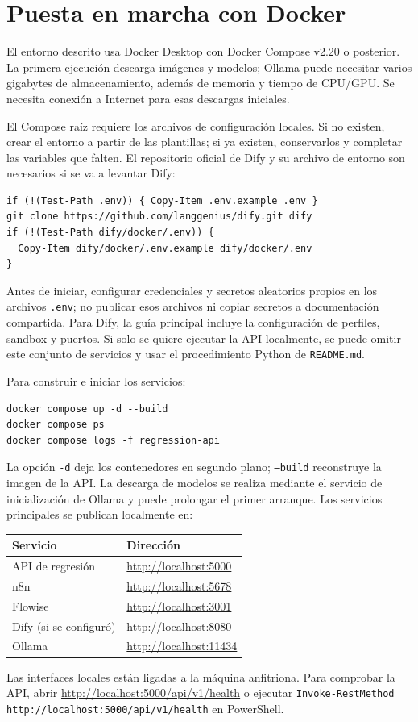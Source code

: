 \documentclass[11pt,a4paper]{article}
\begin{document}
\section{Puesta en marcha con Docker}
El entorno descrito usa Docker Desktop con Docker Compose v2.20 o posterior. La primera ejecución descarga imágenes y modelos; Ollama puede necesitar varios gigabytes de almacenamiento, además de memoria y tiempo de CPU/GPU. Se necesita conexión a Internet para esas descargas iniciales.

El Compose raíz requiere los archivos de configuración locales. Si no existen, crear el entorno a partir de las plantillas; si ya existen, conservarlos y completar las variables que falten. El repositorio oficial de Dify y su archivo de entorno son necesarios si se va a levantar Dify:
\begin{lstlisting}
if (!(Test-Path .env)) { Copy-Item .env.example .env }
git clone https://github.com/langgenius/dify.git dify
if (!(Test-Path dify/docker/.env)) {
  Copy-Item dify/docker/.env.example dify/docker/.env
}
\end{lstlisting}
Antes de iniciar, configurar credenciales y secretos aleatorios propios en los archivos \texttt{.env}; no publicar esos archivos ni copiar secretos a documentación compartida. Para Dify, la guía principal incluye la configuración de perfiles, sandbox y puertos. Si solo se quiere ejecutar la API localmente, se puede omitir este conjunto de servicios y usar el procedimiento Python de \texttt{README.md}.

Para construir e iniciar los servicios:
\begin{lstlisting}
docker compose up -d --build
docker compose ps
docker compose logs -f regression-api
\end{lstlisting}
La opción \texttt{-d} deja los contenedores en segundo plano; \texttt{--build} reconstruye la imagen de la API. La descarga de modelos se realiza mediante el servicio de inicialización de Ollama y puede prolongar el primer arranque. Los servicios principales se publican localmente en:
\begin{center}
\begin{tabular}{ll}\toprule
Servicio & Dirección\\\midrule
API de regresión & \url{http://localhost:5000}\\
n8n & \url{http://localhost:5678}\\
Flowise & \url{http://localhost:3001}\\
Dify (si se configuró) & \url{http://localhost:8080}\\
Ollama & \url{http://localhost:11434}\\\bottomrule
\end{tabular}
\end{center}
Las interfaces locales están ligadas a la máquina anfitriona. Para comprobar la API, abrir \url{http://localhost:5000/api/v1/health} o ejecutar \texttt{Invoke-RestMethod http://localhost:5000/api/v1/health} en PowerShell.
\end{document}
